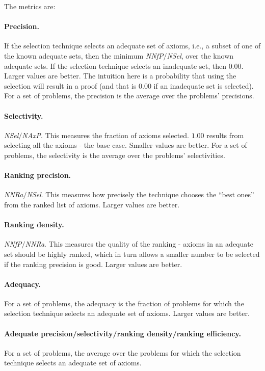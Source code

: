 \documentclass[EPiC]{easychair}
\begin{document}
The metrics are:

\paragraph{Precision.}
If the selection technique selects an adequate set of axioms, i.e., a subset
of one of the known adequate sets, then the minimum \emph{NNfP}$/$\emph{NSel},
over the known adequate sets.
If the selection technique selects an inadequate set, then $0.00$.
Larger values are better.
The intuition here is a probability that using the selection will result
in a proof (and that is $0.00$ if an inadequate set is selected).
For a set of problems, the precision is the average over the problems'
precisions.

\paragraph{Selectivity.}
\emph{NSel}$/$\emph{NAxP}.
This measures the fraction of axioms selected.
$1.00$ results from selecting all the axioms - the base case.
Smaller values are better.
For a set of problems, the selectivity is the average over the problems'
selectivities.

\paragraph{Ranking precision.}
\emph{NNRa}$/$\emph{NSel}.
This measures how precisely the technique chooses the ``best ones'' from
the ranked list of axioms.
Larger values are better.

\paragraph{Ranking density.}
\emph{NNfP}$/$\emph{NNRa}.
This measures the quality of the ranking - axioms in an adequate set should
be highly ranked, which in turn allows a smaller number to be selected if
the ranking precision is good.
Larger values are better.

\paragraph{Adequacy.}
For a set of problems, the adequacy is the fraction of problems for which
the selection technique selects an adequate set of axioms.
Larger values are better.

\paragraph{Adequate precision/selectivity/ranking density/ranking efficiency.}
For a set of problems, the average over the problems for which the selection 
technique selects an adequate set of axioms.
\end{document}
